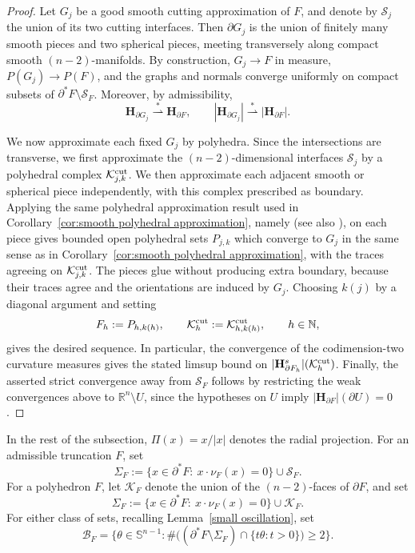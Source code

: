 \documentclass[reqno,11pt]{amsart}
\newcommand{\R}{\mathbb R}
\numberwithin{equation}{section}
\theoremstyle{remark}
\begin{document}
\begin{proof}
Let $G_j$ be a good smooth cutting approximation of $F$, and denote by
$\mathcal S_j$ the union of its two cutting interfaces. Then $\partial G_j$ is
the union of finitely many smooth pieces and two spherical pieces, meeting
transversely along compact smooth $(n-2)$-manifolds. By construction,
$G_j\to F$ in measure, $P(G_j)\to P(F)$, and the graphs and normals converge
uniformly on compact subsets of $\partial^*F\setminus\mathcal S_F$. Moreover,
by admissibility,
\[
\mathbf H_{\partial G_j}\stackrel{*}{\rightharpoonup}\mathbf H_{\partial F},
\qquad
|\mathbf H_{\partial G_j}|\stackrel{*}{\rightharpoonup}
|\mathbf H_{\partial F}|.
\]

We now approximate each fixed $G_j$ by polyhedra. Since the intersections are
transverse, we first approximate the $(n-2)$-dimensional interfaces
$\mathcal S_j$ by a polyhedral complex $\mathcal K_{j,k}^{\rm cut}$. We then
approximate each adjacent smooth or spherical piece independently, with this
complex prescribed as boundary. Applying the same polyhedral approximation
result used in Corollary~\ref{cor:smooth polyhedral approximation}, namely
\cite{BGM2010} (see also \cite{Fu1993,CSM2006}), on each piece gives bounded
open polyhedral sets $P_{j,k}$ which converge to $G_j$ in the same sense as in
Corollary~\ref{cor:smooth polyhedral approximation}, with the traces agreeing
on $\mathcal K_{j,k}^{\rm cut}$. The pieces glue without producing extra
boundary, because their traces agree and the orientations are induced by $G_j$.
Choosing $k(j)$ by a diagonal argument and setting
\[
F_h:=P_{h,k(h)},\qquad
\mathcal K_h^{\rm cut}:=\mathcal K_{h,k(h)}^{\rm cut}, \qquad h \in \mathbb N,
\]
gives the desired sequence. In particular, the convergence of the
codimension-two curvature measures gives the stated limsup bound on
$|\mathbf H^s_{\partial F_h}|(\mathcal K_h^{\rm cut})$.
Finally, the asserted strict convergence away from $\mathcal S_F$ follows by
restricting the weak convergences above to $\R^n\setminus U$, since the
hypotheses on $U$ imply $|\mathbf H_{\partial F}|(\partial U)=0$.
\end{proof}

In the rest of the subsection, $\Pi(x)=x/|x|$ denotes the radial projection.
For an admissible truncation $F$, set
\[
\Sigma_F:=\{x\in\partial^*F:\ x\cdot\nu_F(x)=0\}\cup\mathcal S_F .
\]
For a polyhedron $F$, let $\mathcal K_F$ denote the union of the
$(n-2)$-faces of $\partial F$, and set
\[
\Sigma_F:=\{x\in\partial^*F:\ x\cdot\nu_F(x)=0\}\cup\mathcal K_F .
\]
For either class of sets, recalling Lemma~\ref{small oscillation}, set
\[
 \mathcal B_F=\Big\{\theta\in \mathbb S^{n-1}:
 \#\big((\partial^*F\setminus\Sigma_F)\cap\{t\theta:t>0\}\big)\ge 2\Big\}.
\]
\end{document}
